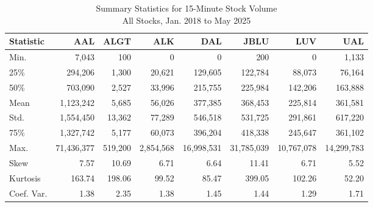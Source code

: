 \begin{table}[H]
\caption{
{ Summary Statistics for 15-Minute Stock Volume} \\
{\small All Stocks, Jan. 2018 to May 2025}
} 

\fontsize{10.0pt}{12pt}\selectfont

\begin{tabular*}{\linewidth}{@{\extracolsep{\fill}}lrrrrrrr}
\toprule
Statistic & AAL & ALGT & ALK & DAL & JBLU & LUV & UAL \\ 
\midrule\addlinespace[2.5pt]
Min. & 7,043 & 100 & 0 & 0 & 200 & 0 & 1,133 \\
25\% & 294,206 & 1,300 & 20,621 & 129,605 & 122,784 & 88,073 & 76,164 \\
50\% & 703,090 & 2,527 & 33,996 & 215,755 & 225,984 & 142,206 & 163,888 \\
Mean & 1,123,242 & 5,685 & 56,026 & 377,385 & 368,453 & 225,814 & 361,581 \\
Std. & 1,554,450 & 13,362 & 77,289 & 546,518 & 531,725 & 291,861 & 617,220 \\
75\% & 1,327,742 & 5,177 & 60,073 & 396,204 & 418,338 & 245,647 & 361,102 \\
Max. & 71,436,377 & 519,200 & 2,854,568 & 16,998,531 & 31,785,039 & 10,767,078 & 14,299,783 \\
Skew & 7.57 & 10.69 & 6.71 & 6.64 & 11.41 & 6.71 & 5.52 \\
Kurtosis & 163.74 & 198.06 & 99.52 & 85.47 & 399.05 & 102.26 & 52.20 \\
Coef. Var. & 1.38 & 2.35 & 1.38 & 1.45 & 1.44 & 1.29 & 1.71 \\
\bottomrule
\end{tabular*}

\end{table}
